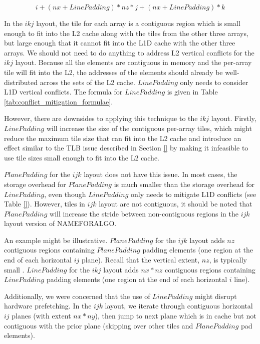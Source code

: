 \documentclass[conference]{IEEEtran}
\begin{document}
\[
i + (nx + LinePadding) * nz * j + (nx + LinePadding) * k
\]

In the \(ikj\) layout, the tile for each array is a contiguous region which is
small enough to fit into the L2 cache along with the tiles from the other three
arrays, but large enough that it cannot fit into the L1D cache with the other
three arrays. We should not need to do anything to address L2 vertical
conflicts for the \(ikj\) layout. Because all the elements are contiguous in
memory and the per-array tile will fit into the L2, the addresses of the
elements should already be well-distributed across the sets of the L2 cache.
\(LinePadding\) only needs to consider L1D vertical conflicts. The formula for
\(LinePadding\) is given in Table \ref{tab:conflict_mitigation_formulae}.

However, there are downsides to applying this technique to the \(ikj\) layout.
Firstly, \(LinePadding\) will increase the size of the contiguous per-array
tiles, which might reduce the maximum tile size that can fit into the L2 cache
and introduce an effect similar to the TLB issue described in Section \ref{} by
making it infeasible to use tile sizes small enough to fit into the L2 cache.

\(PlanePadding\) for the \(ijk\) layout does not have this issue. In most
cases, the storage overhead for \(PlanePadding\) is much smaller than the
storage overhead for \(LinePadding\), even though \(LinePadding\) only needs to
mitigate L1D conflicts (see Table \ref{}). However, tiles in \(ijk\) layout are
not contiguous, it should be noted that \(PlanePadding\) will increase the
stride between non-contiguous regions in the \(ijk\) layout version of
NAMEFORALGO. 

An example might be illustrative. \(PlanePadding\) for the \(ijk\) layout adds
\(nz\) contiguous regions containing \(PlanePadding\) padding elements (one region
at the end of each horizontal \(ij\) plane). Recall that the vertical extent, \(nz\), 
is typically small . \(LinePadding\) for the \(ikj\) layout adds
\(nx*nz\) contiguous regions containing \(LinePadding\) padding elements (one region
at the end of each horizontal \(i\) line).

Additionally, we were concerned that the use of \(LinePadding\) might disrupt
hardware prefetching. In the \(ijk\) layout, we iterate through contiguous
horizontal \(ij\) planes (with extent \(nx*ny\)), then jump to next plane which
is in cache but not contiguous with the prior plane (skipping over other
tiles and \(PlanePadding\) pad elements).
\end{document}
